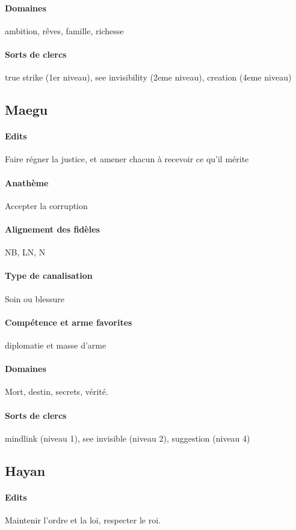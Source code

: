 \documentclass[10pt,a4paper]{book}
\begin{document}
\paragraph{Domaines}ambition, rêves, famille, richesse
\paragraph{Sorts de clercs}true strike (1er niveau), see invisibility (2eme niveau), creation (4eme niveau)
\subsection{Maegu}
\paragraph{Edits} Faire régner la justice, et amener chacun à recevoir ce qu'il mérite
\paragraph{Anathème}Accepter la corruption
\paragraph{Alignement des fidèles} NB, LN, N
\paragraph{Type de canalisation}Soin ou blessure
\paragraph{Compétence et arme favorites} diplomatie et masse d'arme
\paragraph{Domaines}Mort, destin, secrets, vérité.
\paragraph{Sorts de clercs}mindlink (niveau 1), see invisible (niveau 2), suggestion (niveau 4)
\subsection{Hayan}
\paragraph{Edits}Maintenir l'ordre et la loi, respecter le roi.
\end{document}
